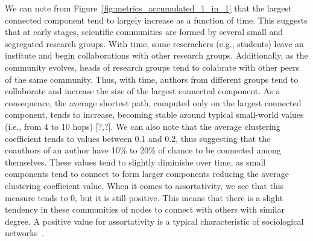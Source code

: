 We can note from Figure~\ref{fig:metrics_accumulated_1_in_1} that the largest connected component tend to largely increase as a function of time. This suggests that at early stages, scientific communities are formed by several small and segregated research groups. With time, some reserachers (e.g., students) leave an institute and begin collaborations with other research groups. Additionally, as the community evolves, heads of  research groups tend to colabrate with other peers of the same community. Thus, with time, authors from different groups tend to collaborate and increase the size of the largest connected component. As a consequence, the average shortest path, computed only on the largest connected component, tends to increase, becoming stable around typical small-world values (i.e., from 4 to 10 hops) [?,?].  We can also note that the average clustering coefficient tends to values between 0.1 and 0.2, thus suggesting that the coauthors of an author have 10\% to 20\% of chance to
be connected among themselves. These values tend to slightly diminishe over time, as small components tend to connect to form larger components reducing the average clustering coefficient value.  When it comes to assortativity, we see that this measure tends to 0, but it is still positive. This means that there is a slight tendency in these communities of nodes to connect with others with similar degree.  A positive value for assortativity is a typical characteristic of sociological networks~\cite{Newman2003}.

